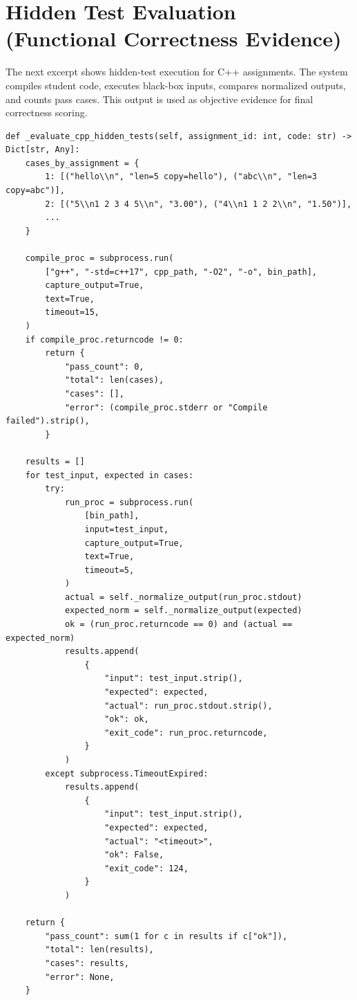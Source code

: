 \section{Hidden Test Evaluation (Functional Correctness Evidence)}
The next excerpt shows hidden-test execution for C++ assignments. The system compiles student code, executes black-box inputs, compares normalized outputs, and counts pass cases. This output is used as objective evidence for final correctness scoring.

\begin{verbatim}
def _evaluate_cpp_hidden_tests(self, assignment_id: int, code: str) -> Dict[str, Any]:
    cases_by_assignment = {
        1: [("hello\\n", "len=5 copy=hello"), ("abc\\n", "len=3 copy=abc")],
        2: [("5\\n1 2 3 4 5\\n", "3.00"), ("4\\n1 1 2 2\\n", "1.50")],
        ...
    }

    compile_proc = subprocess.run(
        ["g++", "-std=c++17", cpp_path, "-O2", "-o", bin_path],
        capture_output=True,
        text=True,
        timeout=15,
    )
    if compile_proc.returncode != 0:
        return {
            "pass_count": 0,
            "total": len(cases),
            "cases": [],
            "error": (compile_proc.stderr or "Compile failed").strip(),
        }

    results = []
    for test_input, expected in cases:
        try:
            run_proc = subprocess.run(
                [bin_path],
                input=test_input,
                capture_output=True,
                text=True,
                timeout=5,
            )
            actual = self._normalize_output(run_proc.stdout)
            expected_norm = self._normalize_output(expected)
            ok = (run_proc.returncode == 0) and (actual == expected_norm)
            results.append(
                {
                    "input": test_input.strip(),
                    "expected": expected,
                    "actual": run_proc.stdout.strip(),
                    "ok": ok,
                    "exit_code": run_proc.returncode,
                }
            )
        except subprocess.TimeoutExpired:
            results.append(
                {
                    "input": test_input.strip(),
                    "expected": expected,
                    "actual": "<timeout>",
                    "ok": False,
                    "exit_code": 124,
                }
            )

    return {
        "pass_count": sum(1 for c in results if c["ok"]),
        "total": len(results),
        "cases": results,
        "error": None,
    }
\end{verbatim}

